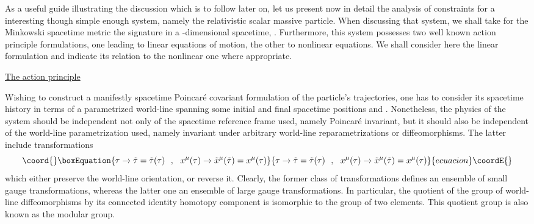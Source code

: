 \documentclass[a4paper,11pt]{article}
\def\Z{\mathbb Z}
\begin{document}
As a useful guide illustrating the discussion which is to follow
later on, let us present now in detail the analysis of constraints
for a interesting though simple enough system, namely the relativistic
scalar massive particle.\cite{JG1} When discussing that system, we shall 
take for the Minkowski spacetime metric the signature 
\coordHE{}
in a \coordHE{}-dimensional spacetime, \coordHE{}. Furthermore,
this system possesses two well known action principle formulations,
one leading to linear equations of motion, the other to nonlinear equations.
We shall consider here the linear formulation and indicate its relation
to the nonlinear one where appropriate.

\vspace{10pt}

\noindent\underline{The action principle}

\vspace{5pt}

Wishing to construct a manifestly spacetime Poincar\'e covariant
formulation of the particle's trajectories, one has to consider
its spacetime history in terms of a parametrized world-line \coordHE{}
spanning some initial and final spacetime positions \coordHE{} and \coordHE{}.
Nonetheless, the physics of the system should be independent not only
of the spacetime reference frame used, namely Poincar\'e invariant,
but it should also be independent of the world-line \myHighlight{$\tau$}\coordHE{} parametrization
used, namely invariant under arbitrary world-line reparametrizations or
diffeomorphisms. The latter include transformations
\begin{equation}\coord{}\boxEquation{
\tau\rightarrow\tilde{\tau}=\tilde{\tau}(\tau)\ \ ,\ \ 
x^\mu(\tau)\rightarrow\tilde{x}^\mu(\tilde{\tau})=x^\mu(\tau)
\label{eq:wltransf}
}{
\tau\rightarrow\tilde{\tau}=\tilde{\tau}(\tau)\ \ ,\ \ 
x^\mu(\tau)\rightarrow\tilde{x}^\mu(\tilde{\tau})=x^\mu(\tau)
}{ecuacion}\coordE{}\end{equation}
which either preserve the world-line orientation, or reverse it.
Clearly, the former class of transformations defines an ensemble
of small gauge transformations, whereas the latter one an ensemble
of large gauge transformations. In particular, the quotient of
the group of world-line diffeomorphisms by its connected identity
homotopy component is isomorphic to the group \myHighlight{$\Z_2$}\coordHE{} of two elements.
This quotient group is also known as the modular group.
\end{document}
